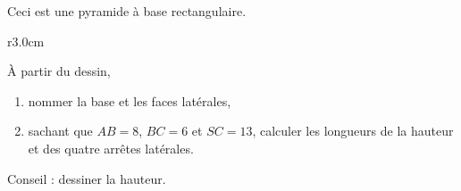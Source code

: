 
\begin{exercice}\label{exo2smath-0181}

    Ceci est une pyramide à base rectangulaire.

\begin{wrapfigure}{r}{3.0cm}
   \vspace{-0.5cm}        %
   \centering
   
\end{wrapfigure}
À partir du dessin,
\begin{enumerate}
    \item
        nommer la base et les faces latérales,
    \item
        sachant que \( AB=8\), \( BC=6\) et \( SC=13\), calculer les longueurs de la hauteur et des quatre arrêtes latérales.
\end{enumerate}

Conseil : dessiner la hauteur.


\end{exercice}
